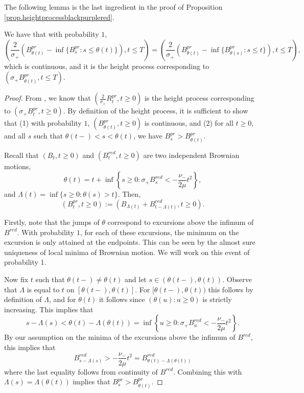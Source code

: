 The following lemma is the last ingredient in the proof of Proposition \ref{prop.heightprocessblackpurplered}.
\begin{lemma}\label{lemma.heightprocesstimechange}
We have that with probability $1$, $$\left(\frac{2}{\sigma_+} \left(B^{pr}_{\theta (t)}-\inf\{B^{pr}_{s}:s\leq \theta(t)\}\right), t\leq T \right)=\left(\frac{2}{\sigma_+} \left(B^{pr}_{\theta (t)}-\inf\{B^{pr}_{\theta(s)}:s\leq t\}\right), t\leq T \right),$$ which is continuous, and it is the height process corresponding to $\left(\sigma_+ B^{pr}_{\theta (t)},t\leq T\right)$. 
\end{lemma}
\begin{proof}
From \cite{legallRandomTreesApplications2005}, we know that $\left(\frac{2}{\sigma_+}R^{pr}_t,t\geq 0\right)$ is the height process corresponding to $\left(\sigma_+ B^{pr}_{t},t\geq 0\right)$. By definition of the height process, it is sufficient to show that (1) with probability $1$, $(B^{pr}_{\theta(t)},t\geq 0)$ is continuous, and (2) for all $t\geq 0$, and all $s$ such that $\theta(t-)<s<\theta(t)$, we have $B^{pr}_s > B^{pr}_{\theta(t)}$.

Recall that $(B_t, t \geq 0)$ and $(B^{red}_t, t\geq 0)$ are two independent Brownian motions, $$\theta(t)=t+\inf\left\{s\geq 0 : \sigma_+ B^{red}_s< -\frac{\nu_-}{2\mu} t^2\right\},$$ and $\Lambda(t)=\inf\{s\geq 0:\theta(s)> t\}$. Then,
\begin{equation*}
  \left(B^{pr}_t,t \geq 0\right):=\left( B_{\Lambda(t)}+ B^{red}_{t-\Lambda(t)}, t\geq 0\right).
\end{equation*}

Firstly, note that the jumps of $\theta$ correspond to excursions above the infimum of $B^{red}$.  With probability $1$, for each of these excursions, the minimum on the excursion is only attained at the endpoints. This can be seen by the almost sure uniqueness of local minima of Brownian motion. We will work on this event of probability 1.

Now fix $t$ such that $\theta(t-)\neq \theta(t)$ and let $s\in (\theta(t-),\theta(t))$. Observe that $\Lambda$ is equal to $t$ on $[\theta(t-),\theta(t)]$. For $[\theta(t-),\theta(t))$ this follows by definition of $\Lambda$, and for $\theta(t)$ it follows since $(\theta(u):u\geq 0)$ is strictly increasing. This implies that
\begin{equation*}
  s-\Lambda(s)<\theta(t)-\Lambda(\theta(t))=\inf\left\{ u\geq 0: \sigma_+ B_u^{red}<-\frac{\nu_-}{2\mu} t^2\right\}. 
\end{equation*}
By our assumption on the minima of the excursions above the infimum of $B^{red}$, this implies that
\begin{equation*}
  B^{red}_{s-\Lambda(s)}>-\frac{\nu_-}{2\mu} t^2=B^{red}_{\theta(t)-\Lambda(\theta(t))}
\end{equation*}
where the last equality follows from continuity of $B^{red}$. Combining this with $\Lambda(s)=\Lambda(\theta(t))$ implies that
$B^{pr}_s>B^{pr}_{\theta(t)}$.


\end{proof}
